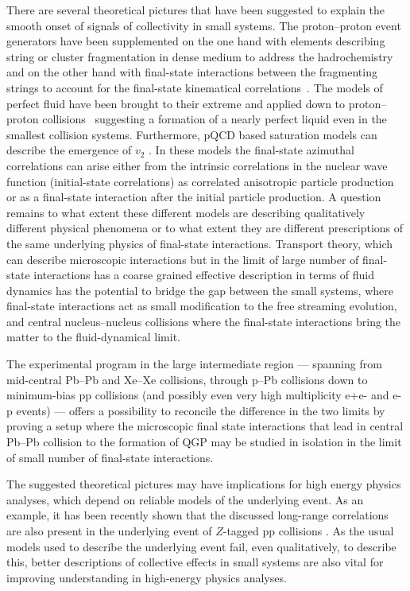 \documentclass[../report.tex]{subfiles}
\begin{document}
There are several theoretical pictures that have been suggested to explain the smooth onset of signals of collectivity in small systems. The proton--proton event generators have been supplemented on the one hand with elements describing string or cluster fragmentation in dense medium \cite{Bierlich:2014xba,Gieseke:2017clv} to address the hadrochemistry and on the other hand with final-state interactions between the fragmenting strings to account for the final-state kinematical correlations~\cite{Bierlich:2017vhg}. 
The models of perfect fluid have been brought to their extreme and applied down to proton--proton collisions~\cite{Werner:2007bf,Weller:2017tsr,Aidala:2018mcw} suggesting a formation of a nearly perfect liquid even in the smallest collision systems. Furthermore, pQCD based saturation models can describe the emergence of $v_2$ . In these models the final-state azimuthal correlations can arise either from the intrinsic correlations in the nuclear wave function (initial-state correlations) as correlated anisotropic particle production or as a final-state interaction after the initial particle production. 
A question remains to what extent these different models are describing qualitatively different physical phenomena or to what extent they are different prescriptions of the same underlying physics of final-state interactions. Transport theory, which can describe microscopic interactions but in the limit of large number of final-state interactions has a coarse grained effective description in terms of fluid dynamics has the potential to bridge the gap between the small systems, where final-state interactions act as small modification to the free streaming evolution, and central nucleus--nucleus collisions where the final-state interactions bring the matter to the fluid-dynamical limit. 

The experimental program in the large intermediate region --- spanning from mid-central Pb--Pb and Xe--Xe collisions, through p--Pb collisions down to minimum-bias pp collisions (and possibly even very high multiplicity e+e- and e-p events) --- offers a possibility to reconcile the difference in the two limits by proving a setup where the microscopic final state interactions that lead in central Pb--Pb collision to the formation of QGP may be studied in isolation in the limit of small number of final-state interactions.  

The suggested theoretical pictures may have implications for high energy physics analyses, which depend on reliable models of the underlying event. As an example, it has been recently shown that the discussed long-range correlations are also present in the underlying event of $Z$-tagged pp collisions \cite{ATLAS:2017nkt}. As the usual models used to describe the underlying event fail, even qualitatively, to describe this, better descriptions of collective effects in small systems are also vital for improving understanding in high-energy physics analyses.
\end{document}
